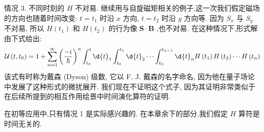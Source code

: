\documentclass[lang=cn,newtx,10pt,scheme=chinese,thmcnt=section]{elegantbook}
\begin{document}
情况 3. 不同时刻的 $H$ 不对易. 继续用与自旋磁矩相关的例子,这一次我们假定磁场的方向也随着时间改变: $t = {t}_{1}$ 时沿 $x$ 方向, $t = {t}_{2}$ 时沿 $y$ 方向等. 因为 ${S}_{x}$ 与 ${S}_{y}$ 不对易, 所以 $H\left( {t}_{1}\right)$ 和 $H\left( {t}_{2}\right)$ 的行为像 $\mathbf{S} \cdot \mathbf{B}$ ,也不对易. 在这种情况下,形式解由下式给出:
\begin{equation}
	\mathcal{U}\left( {t,{t}_{0}}\right) = 1 + \mathop{\sum }\limits_{{n = 1}}^{\infty }{\left( \frac{-i}{\hbar }\right) }^{n}\int_{{t}_{0}}^{t}\d{t}_{1}\int_{{t}_{0}}^{{t}_{1}}\d{t}_{2}\cdots \int_{{t}_{0}}^{{t}_{n - 1}}\d{t}_{n}H\left( {t}_{1}\right) H\left( {t}_{2}\right) \cdots H\left( {t}_{n}\right)
\end{equation}
该式有时称为戴森 (Dyson) 级数, 它以 F. J. 戴森的名字命名, 因为他在量子场论中发展了这种形式的微扰展开. 我们现在不证明这个式子, 因为其证明非常类似于在后续所提到的相互作用绘景中时间演化算符的证明.

在初等应用中,只有情况 1 是实际感兴趣的. 在本章余下的部分,我们假定 $H$ 算符是时间无关的.
\end{document}
